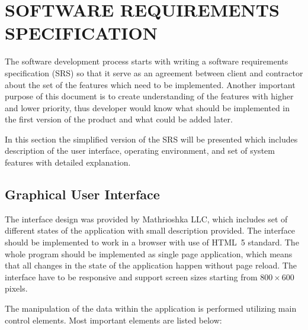 \section{SOFTWARE REQUIREMENTS SPECIFICATION}

The software development process starts with writing a software requirements specification (SRS) so
that it serve as an agreement between client and contractor about the set of the features which need
to be implemented. Another important purpose of this document is to create understanding of the
features with higher and lower priority, thus developer would know what should be implemented in the
first version of the product and what could be added later.

In this section the simplified version of the SRS will be presented which includes description
of the user interface, operating environment, and set of system features with detailed
explanation.

\subsection{Graphical User Interface}

The interface design was provided by Mathrioshka LLC, which includes set of different states
of the application with small description provided. The interface should be implemented
to work in a browser with use of HTML~5 standard. The whole program should be implemented
as single page application, which means that all changes in the state of the application
happen without page reload. The interface have to be responsive and support screen sizes
starting from $800 \times 600$ pixels.

The manipulation of the data within the application is performed utilizing main control elements.
Most important elements are listed below:

